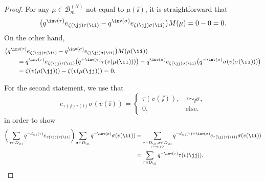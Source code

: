 \begin{proof}
For any $\mu \in \mathcal{B}^{(N)}_m$ not equal to $\mu(\ii)$, it is straightforward that
\[
\big(q^{\inv(\tau)}e_{\zeta(\jj) \tau(\ii)} - q^{\inv(\sigma)}e_{\zeta(\jj) \sigma(\ii)} \big) M(\mu)=0-0=0.
\]
On the other hand,
\begin{gather*}
\begin{split}
&\big(q^{\inv(\tau)}e_{\zeta(\jj) \tau(\ii)} - q^{\inv(\sigma)}e_{\zeta(\jj) \sigma(\ii)} \big) M(\mu(\ii))\\
&\qquad = q^{\inv(\tau)}e_{\zeta(\jj) \tau(\ii)} \big(q^{-\inv(\tau)} \tau(v(\mu(\ii)) )\big) - q^{\inv(\sigma)}e_{\zeta(\jj) \sigma(\ii)} \big(q^{-\inv(\sigma)} \sigma(v(\sigma(\ii)) )\big) \\
&\qquad = \zeta(v(\mu(\jj))) - \zeta(v(\mu(\jj)))=0.
\end{split}
\end{gather*}

For the second statement, we use that
\[
e_{\tau(\jj)\tau(\ii)}\sigma(v(\ii))
=
\begin{cases}
\tau(v(\jj)), & \tau \sim_{\ii} \sigma, \\
0, & \text{else.}
\end{cases}
\]
in order to show
\begin{align*}
\bigg( \sum_{\tau \in D_{\jj}} q^{-d_{\ii}(\tau)}e_{\tau(\jj)\tau(\ii)} \bigg) \sum_{\sigma \in D_{\ii}} q^{-\inv(\sigma)} \sigma(v(\ii)) &= \sum_{\substack{\tau \in D_{\jj},\sigma \in D_{\ii} \\ \tau\sim_{\ii} \sigma}}q^{-d_{\ii}(\tau)+ \inv(\sigma)} e_{\tau(\jj)\tau(\ii)}\sigma(v(\ii))\\
&= \sum_{\tau \in D_{\jj}} q^{-\inv(\tau)} \tau(v(\jj)).\tag*{\qed}
\end{align*}\renewcommand{\qed}{}
\end{proof}
